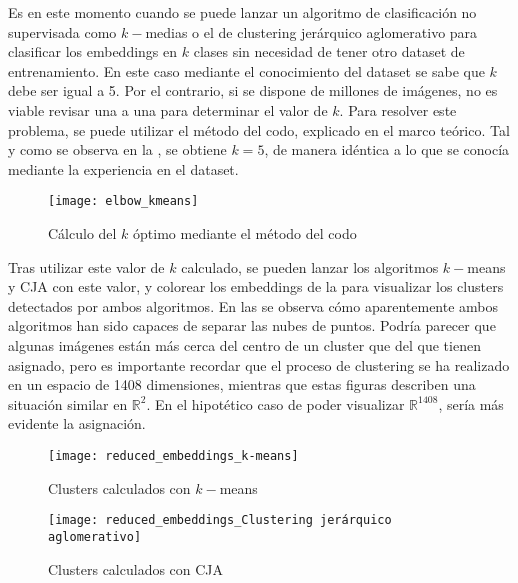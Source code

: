 				Es en este momento cuando se puede lanzar un algoritmo de clasificación no supervisada como $k-$medias o el de clustering jerárquico aglomerativo para clasificar los embeddings en $k$ clases sin necesidad de tener otro dataset de entrenamiento. En este caso mediante el conocimiento del dataset se sabe que $k$ debe ser igual a 5. Por el contrario, si se dispone de millones de imágenes, no es viable revisar una a una para determinar el valor de $k$. Para resolver este problema, se puede utilizar el método del codo, explicado en el marco teórico. Tal y como se observa en la , se obtiene $k = 5$, de manera idéntica a lo que se conocía mediante la experiencia en el dataset. \\
				
				\begin{figure}[!h]
					\centering
					\texttt{[image: elbow\_kmeans]}
					\caption{Cálculo del $k$ óptimo mediante el método del codo}
					\label{fig:elbow}
				\end{figure} 
				
				Tras utilizar este valor de $k$ calculado, se pueden lanzar los algoritmos $k-$means y CJA con este valor, y colorear los embeddings de la  para visualizar los clusters detectados por ambos algoritmos. En las  se observa cómo aparentemente ambos algoritmos han sido capaces de separar las nubes de puntos. Podría parecer que algunas imágenes están más cerca del centro de un cluster que del que tienen asignado, pero es importante recordar que el proceso de clustering se ha realizado en un espacio de 1408 dimensiones, mientras que estas figuras describen una situación similar en $\mathbb{R}^2$. En el hipotético caso de poder visualizar $\mathbb{R}^{1408}$, sería más evidente la asignación. 
				
				\begin{figure}[!h]
					\centering
					\texttt{[image: reduced\_embeddings\_k-means]}
					\caption{Clusters calculados con $k-$means}
					\label{fig:clusters_kmeans}
				\end{figure} 
				
				\begin{figure}[!h]
					\centering
					\texttt{[image: reduced\_embeddings\_Clustering jerárquico aglomerativo]}
					\caption{Clusters calculados con CJA}
					\label{fig:clusters_cja}
				\end{figure} 
				
